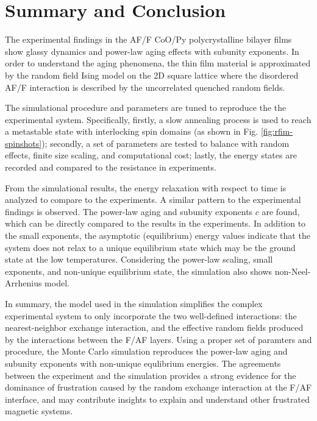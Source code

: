 \section{Summary and Conclusion}
The experimental findings in the AF/F CoO/Py polycrystalline bilayer films show glassy dynamics and power-law aging effects with subunity exponents. In order to understand the aging phenomena, the thin film material is approximated by the random field Ising model on the 2D square lattice where the disordered AF/F interaction is described by the uncorrelated quenched random fields.

The simulational procedure and parameters are tuned to reproduce the the experimental system. Specifically, firstly, a slow annealing process is used to reach a metastable state with interlocking spin domains (as shown in Fig. \ref{fig:rfim-spinshots}); secondly, a set of parameters are tested to balance with random effects, finite size scaling, and computational cost; lastly, the energy states are recorded and compared to the resistance in experiments.

From the simulational results, the energy relaxation with respect to time is analyzed to compare to the experiments. A similar pattern to the experimental findings is observed. The power-law aging and subunity exponents $c$ are found, which can be directly compared to the results in the experiments. In addition to the small exponents, the asymptotic (equilibrium) energy values indicate that the system does not relax to a unique equilibrium state which may be the ground state at the low temperatures. Considering the power-law scaling, small exponents, and non-unique equilibrium state, the simulation also shows non-Neel-Arrhenius model.

In summary, the model used in the simulation simplifies the complex experimental system to only incorporate the two well-defined interactions: the nearest-neighbor exchange interaction, and the effective random fields produced by the interactions between the F/AF layers. Using a proper set of paramters and procedure, the Monte Carlo simulation reproduces the power-law aging and subunity exponents with non-unique equlibrium energies. The agreements between the experiment and the simulation provides a strong evidence for the dominance of frustration caused by the random exchange interaction at the F/AF interface, and may contribute insights to explain and understand other frustrated magnetic systems.

  





